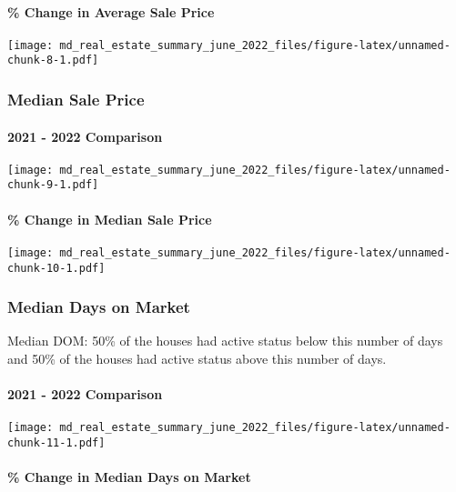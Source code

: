 \documentclass[
]{article}
\begin{document}
\hypertarget{change-in-average-sale-price}{%
\paragraph{\% Change in Average Sale
Price}\label{change-in-average-sale-price}}

\texttt{[image: md\_real\_estate\_summary\_june\_2022\_files/figure-latex/unnamed-chunk-8-1.pdf]}

\hypertarget{median-sale-price}{%
\subsubsection{Median Sale Price}\label{median-sale-price}}

\hypertarget{comparison-4}{%
\paragraph{2021 - 2022 Comparison}\label{comparison-4}}

\texttt{[image: md\_real\_estate\_summary\_june\_2022\_files/figure-latex/unnamed-chunk-9-1.pdf]}

\hypertarget{change-in-median-sale-price}{%
\paragraph{\% Change in Median Sale
Price}\label{change-in-median-sale-price}}

\texttt{[image: md\_real\_estate\_summary\_june\_2022\_files/figure-latex/unnamed-chunk-10-1.pdf]}

\hypertarget{median-days-on-market}{%
\subsubsection{Median Days on Market}\label{median-days-on-market}}

Median DOM: 50\% of the houses had active status below this number of
days and 50\% of the houses had active status above this number of days.

\hypertarget{comparison-5}{%
\paragraph{2021 - 2022 Comparison}\label{comparison-5}}

\texttt{[image: md\_real\_estate\_summary\_june\_2022\_files/figure-latex/unnamed-chunk-11-1.pdf]}

\hypertarget{change-in-median-days-on-market}{%
\paragraph{\% Change in Median Days on
Market}\label{change-in-median-days-on-market}}
\end{document}
